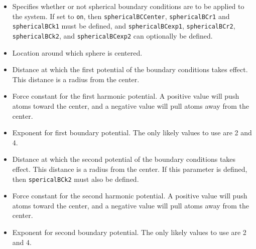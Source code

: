 \begin{itemize}

\item
{}
{Specifies whether or not spherical boundary conditions 
are to be applied to the system.  If 
set to {\tt on}, then {\tt sphericalBCCenter}, {\tt sphericalBCr1} and {\tt sphericalBCk1} 
must be defined, and {\tt sphericalBCexp1}, {\tt sphericalBCr2}, 
{\tt sphericalBCk2}, and {\tt sphericalBCexp2} can optionally be 
defined.}

\item
{}
{Location around which sphere is centered.}

\item
{}
{Distance at which the first potential of the boundary conditions takes
effect.  This distance is a radius from the center.}

\item
{}
{Force constant for the first harmonic potential.  A positive
value will push atoms toward the center, and a negative
value will pull atoms away from the center.}

\item
{}
{Exponent for first boundary potential.  The only likely values to
use are 2 and 4.}

\item
{}
{Distance at which the second potential of the boundary conditions takes
effect.  This distance is a radius from the center.
If this parameter is defined, then {\tt spericalBCk2} must also
be defined.}

\item
{}
{Force constant for the second harmonic potential.  A positive
value will push atoms toward the center, and a negative
value will pull atoms away from the center.}

\item
{}
{Exponent for second boundary potential.  The only likely values to
use are 2 and 4.}

\end{itemize}

